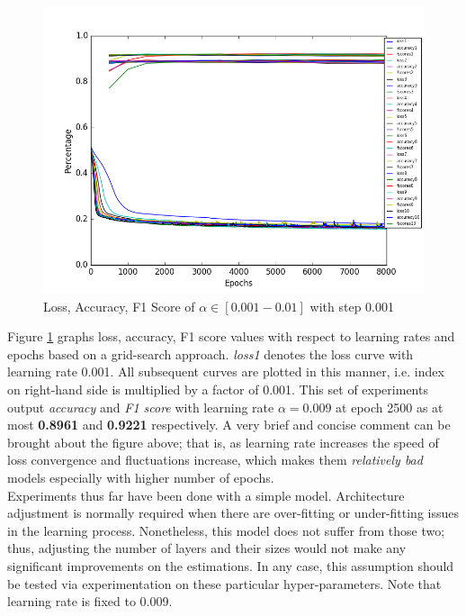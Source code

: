 \documentclass[conference]{IEEEtran}
\begin{document}
\begin{figure}[H]
	\includegraphics[width=0.9\columnwidth]{mix_plot_lr.png}
	\caption{Loss, Accuracy, F1 Score of $\alpha \in [0.001 - 0.01]$ with step 0.001} 
	\label{mix_lr}
\end{figure}

Figure \ref{mix_lr} graphs loss,  accuracy, F1 score values with respect to learning rates and epochs based on a grid-search approach. \textit{loss1} denotes the loss curve with learning rate 0.001. All subsequent curves are plotted in this manner, i.e. index on right-hand side is multiplied by a factor of 0.001. This set of experiments output \textit{accuracy} and \textit{F1 score} with learning rate $\alpha=0.009$ at epoch 2500 as at most \textbf{0.8961} and \textbf{0.9221} respectively. A very brief and concise comment can be brought about the figure above; that is, as learning rate increases the speed of loss convergence and fluctuations increase, which makes them \textit{relatively bad} models especially with higher number of epochs.\\

Experiments thus far have been done with a simple model. Architecture adjustment is normally required when there are over-fitting or under-fitting issues in the learning process. Nonetheless, this model does not suffer from those two; thus, adjusting the number of layers and their sizes would not make any significant improvements on the estimations. In any case, this assumption should be tested via experimentation on these particular hyper-parameters. Note that learning rate is fixed to 0.009.\\
\end{document}
